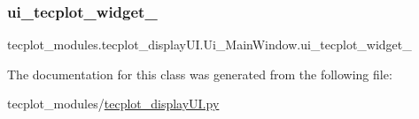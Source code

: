 \subsubsection{\texorpdfstring{ui\+\_\+tecplot\+\_\+widget\+\_}{ui\_tecplot\_widget\_2}}
{\footnotesize\ttfamily tecplot\+\_\+modules.\+tecplot\+\_\+display\+U\+I.\+Ui\+\_\+\+Main\+Window.\+ui\+\_\+tecplot\+\_\+widget\+\_}



The documentation for this class was generated from the following file\+:\begin{DoxyCompactItemize}
\item 
tecplot\+\_\+modules/\hyperlink{a00326}{tecplot\+\_\+display\+U\+I.\+py}\end{DoxyCompactItemize}
